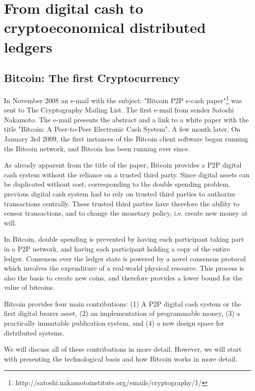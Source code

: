 \chapter{From digital cash to cryptoeconomical distributed ledgers}
\label{sec:crypto}


\section{Bitcoin: The first Cryptocurrency}

 In November 2008 an e-mail with the subject: "Bitcoin P2P e-cash paper"\footnote{http://satoshi.nakamotoinstitute.org/emails/cryptography/1/} was sent to The Cryptography Mailing List. The first e-mail from sender Satoshi Nakamoto. The e-mail presents the abstract and a link to a white paper with the title "Bitcoin: A Peer-to-Peer Electronic Cash System". A few month later, On January 3rd 2009, the first instances of the Bitcoin client software began running the Bitcoin network, and Bitcoin has been running ever since. 

 As already apparent from the title of the paper, Bitcoin provides a P2P digital cash system without the reliance on a trusted third party. Since digital assets can be duplicated without cost, corresponding to the double spending problem, previous digital cash system had to rely on trusted third parties to authorize transactions centrally. These trusted third parties have therefore the ability to censor transactions, and to change the monetary policy, i.e. create new money at will. 

 In Bitcoin, double spending is prevented by having each participant taking part in a P2P network, and having each participant holding a copy of the entire ledger. Consensus over the ledger state is powered by a novel consensus protocol which involves the expenditure of a real-world physical resource. This process is also the basis to create new coins, and therefore provides a lower bound for the value of bitcoins. 

Bitcoin provides four main contributions: (1) A P2P digital cash system or the first digital bearer asset, (2) an implementation of programmable money, (3) a practically immutable publication system, and (4) a new design space for distributed systems. 

We will discuss all of these contributions in more detail. However, we will start with presenting the technological basis and how Bitcoin works in more detail.

